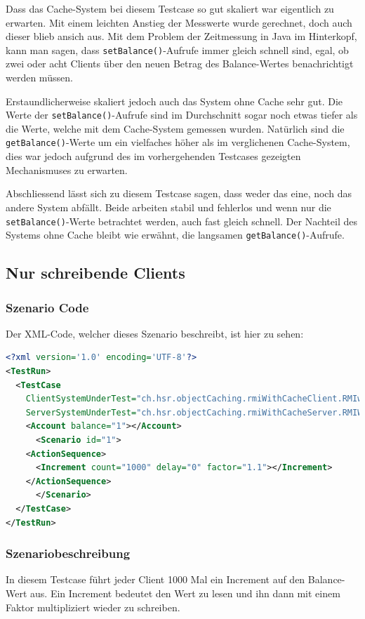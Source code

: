 Dass das Cache-System bei diesem Testcase so gut ska\-liert war eigentlich zu erwarten. Mit einem leichten An\-s\-tieg der Mess\-werte wurde gerechnet, doch auch dieser blieb ansich aus. Mit dem Pro\-blem der Zeit\-messung in Java im Hinter\-kopf, kann man sagen, dass \texttt{setBalance()}-Aufrufe immer gleich schnell sind, egal, ob zwei oder acht Clients über den neuen Betrag des Balance-Wertes benachrichtigt werden müssen.

Erstaundlicherweise skaliert jedoch auch das System ohne Cache sehr gut. Die Werte der \texttt{setBalance()}-Aufrufe sind im Durch\-schnitt sogar noch etwas tiefer als die Werte, welche mit dem Cache-System gemessen wurden. Natürlich sind die \texttt{getBalance()}-Werte um ein vielfaches höher als im verglichenen Cache-System, dies war jedoch aufgrund des im vorhergehenden Testcases gezeigten Mechanismuses zu erwarten.

Abschliessend lässt sich zu diesem Testcase sagen, dass weder das eine, noch das andere System abfällt. Beide arbeiten stabil und fehlerlos und wenn nur die \texttt{setBalance()}-Werte betrachtet werden, auch fast gleich schnell. Der Nachteil des Systems ohne Cache bleibt wie erwähnt, die langsamen \texttt{getBalance()}-Aufrufe.

\subsection{Nur schreibende Clients}
\subsubsection{Szenario Code}
Der XML-Code, welcher dieses Szenario beschreibt, ist hier zu sehen:
\begin{lstlisting}[language=XML, breaklines=true]
<?xml version='1.0' encoding='UTF-8'?>
<TestRun>
  <TestCase
    ClientSystemUnderTest="ch.hsr.objectCaching.rmiWithCacheClient.RMIwithCacheClientSystem"
    ServerSystemUnderTest="ch.hsr.objectCaching.rmiWithCacheServer.RMIWithCacheServerSystem">
    <Account balance="1"></Account>
      <Scenario id="1">
	<ActionSequence>
	  <Increment count="1000" delay="0" factor="1.1"></Increment>
	</ActionSequence>
      </Scenario>
  </TestCase>
</TestRun>
\end{lstlisting}
\subsubsection{Szenariobeschreibung}
In diesem Testcase führt jeder Client 1000 Mal ein Increment auf den Balance-Wert aus. Ein Increment bedeutet den Wert zu lesen und ihn dann mit einem Faktor multipliziert wieder zu schreiben. 

